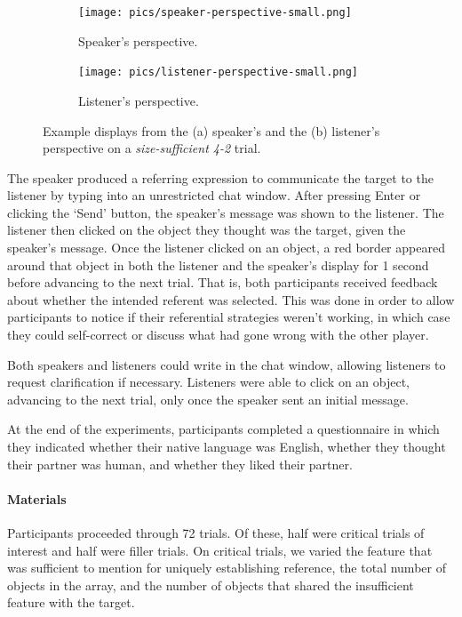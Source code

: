 \documentclass[11pt]{article}
\begin{document}
\begin{figure}
\begin{subfigure}{.5\textwidth}
\texttt{[image: pics/speaker-perspective-small.png]}
\caption{Speaker's perspective.}
\label{fig:speakerpersp}
\end{subfigure}
\begin{subfigure}{.5\textwidth}
\texttt{[image: pics/listener-perspective-small.png]}
\caption{Listener's perspective.}
\label{fig:listenerpersp}
\end{subfigure}
\caption{Example displays from the  (a) speaker's and the (b) listener's perspective on a \emph{size-sufficient 4-2} trial.}
\label{fig:speakerlistenerperspective}
\end{figure}

The speaker produced a referring expression to communicate the target to the listener by typing into an unrestricted chat window. After pressing Enter or clicking the `Send' button, the speaker's message was shown to the listener. The listener then clicked on the object they thought was the target, given the speaker's message.  Once the listener clicked on an object, a red border appeared around that object in both the listener and the speaker's display for 1 second before advancing to the next trial. That is, both participants received feedback about whether the intended referent was selected. This was done in order to allow participants to notice if their referential strategies weren't working, in which case they could self-correct or discuss what had gone wrong with the other player. 

Both speakers and listeners could write in the chat window, allowing listeners to request clarification if necessary. Listeners were able to click on an object, advancing to the next trial, only once the speaker sent an initial message. 

At the end of the experiments, participants completed a questionnaire in which they indicated whether their native language was English, whether they thought their partner was human, and whether they liked their partner.


\paragraph{Materials}

Participants proceeded through 72 trials. Of these, half were critical trials of interest and half were filler trials. On critical trials, we varied the feature that was sufficient to mention for uniquely establishing reference, the total number of objects in the array, and  the number of objects that shared the insufficient feature with the target. 
\end{document}
